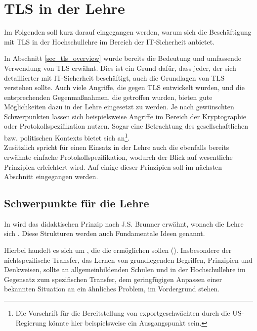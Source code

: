 \chapter{TLS in der Lehre}
\label{cha_tls_teaching}

Im Folgenden soll kurz darauf eingegangen werden, warum sich die Beschäftigung mit TLS in der Hochschullehre im Bereich der IT-Sicherheit anbietet. %

In Abschnitt \ref{sec_tls_overview} wurde bereits die Bedeutung und umfassende Verwendung von TLS erwähnt. Dies ist ein Grund dafür, dass jeder, der sich detaillierter mit IT-Sicherheit beschäftigt, auch die Grundlagen von TLS verstehen sollte. Auch viele Angriffe, die gegen TLS entwickelt wurden, und die entsprechenden Gegenmaßnahmen, die getroffen wurden, bieten gute Möglichkeiten dazu in der Lehre eingesetzt zu werden. Je nach gewünschten Schwerpunkten lassen sich beispielsweise Angriffe im Bereich der Kryptographie oder Protokollspezifikation nutzen. Sogar eine Betrachtung des gesellschaftlichen bzw. politischen Kontexts bietet sich an\footnote{Die Vorschrift für die Bereitstellung von exportgeschwächten \ciphersuites{} durch die US-Regierung könnte hier beispielsweise ein Ausgangspunkt sein.}.\\
Zusätzlich spricht für einen Einsatz in der Lehre auch die ebenfalls bereits erwähnte einfache Protokollspezifikation, wodurch der Blick auf wesentliche Prinzipien erleichtert wird. Auf einige dieser Prinzipien soll im nächsten Abschnitt eingegangen werden.

\section{Schwerpunkte für die Lehre}

In \cite{schubert11} wird das didaktischen Prinzip nach J.S. Brunner erwähnt, wonach die Lehre sich . Diese Strukturen werden auch Fundamentale Ideen genannt.

Hierbei handelt es sich um , die die  ermöglichen sollen (\cite{schubert11}). Insbesondere der nichtspezifische Transfer, das Lernen von grundlegenden Begriffen, Prinzipien und Denkweisen, sollte an allgemeinbildenden Schulen und in der Hochschullehre im Gegensatz zum spezifischen Transfer, dem geringfügigen Anpassen einer bekannten Situation an ein ähnliches Problem, im Vordergrund stehen.

